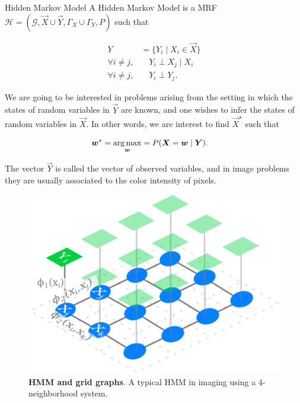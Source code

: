 \begin{definition}{Hidden Markov Model}
A Hidden Markov Model is a MRF $\mathcal{H} = (\mathcal{G},\vec{X} \cup \vec{Y}, \Gamma_X \cup \Gamma_Y,P)$ such that

\begin{align*}
	Y &= \{ Y_i \; | \; X_i \in \vec{X} \} \\
	\forall i \neq j,& \quad Y_i \perp X_j \; | \; X_i \\
	\forall i \neq j,& \quad Y_i \perp Y_j	.
\end{align*}
\end{definition}

We are going to be interested in problems arising from the setting in which the states of random variables in $\vec{Y}$ are known, and one wishes to infer the states of random variables in $\vec{X}$. In other words, we are interest to find $\vec{X}^{\star}$ such that

\begin{align}
	\bm{w}^{\star} &= \operatorname*{arg\,max}_{\bm{w}} = P(\bm{X} = \bm{w} \; | \; \bm{Y}).
	\label{ch2:eq:general-maximum-likelihood}
\end{align}

The vector $\vec{Y}$ is called the vector of observed variables, and in image problems they are usually associated to the color intensity of pixels. 

\begin{figure}
\center
\includegraphics[scale=0.10]{figures/chapter2/mrf/hmm-example.png}
\caption{\textbf{HMM and grid graphs}. A typical HMM in imaging using a $4$-neighborhood system.}
\label{ch2:fig:hmm-multilabeling}
\end{figure}



